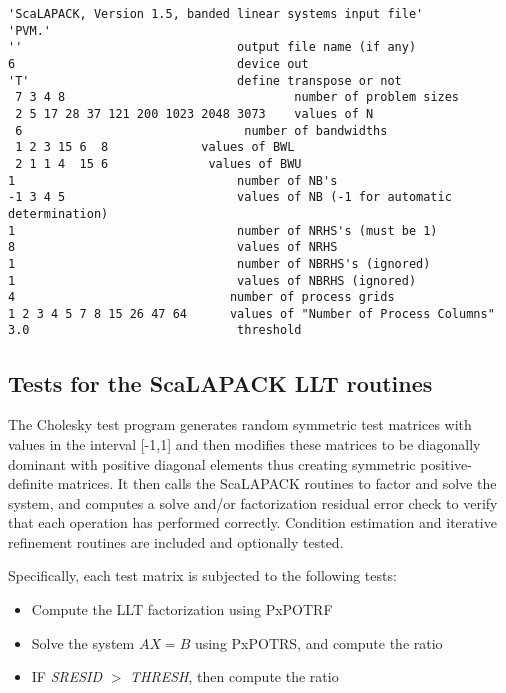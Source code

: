 \documentclass[11pt]{report}
\begin{document}
\begin{verbatim}
'ScaLAPACK, Version 1.5, banded linear systems input file'
'PVM.'
''                              output file name (if any)
6                               device out
'T'                             define transpose or not
 7 3 4 8                                number of problem sizes
 2 5 17 28 37 121 200 1023 2048 3073    values of N
 6                               number of bandwidths
 1 2 3 15 6  8             values of BWL
 2 1 1 4  15 6              values of BWU
1                               number of NB's
-1 3 4 5                        values of NB (-1 for automatic determination)
1                               number of NRHS's (must be 1)
8                               values of NRHS
1                               number of NBRHS's (ignored)
1                               values of NBRHS (ignored)
4                              number of process grids
1 2 3 4 5 7 8 15 26 47 64      values of "Number of Process Columns"
3.0                             threshold
\end{verbatim}

\subsection{Tests for the ScaLAPACK LLT routines}

The Cholesky test program generates random symmetric test matrices with
values in the interval [-1,1] and then modifies these matrices to be
diagonally dominant with positive diagonal elements thus creating
symmetric positive-definite matrices. It then calls the ScaLAPACK 
routines to factor and solve the system, and computes a solve and/or 
factorization residual error check to verify that each operation has performed 
correctly.  Condition estimation and iterative refinement routines are
included and optionally tested.

Specifically, each test matrix is subjected to the following tests:

\begin{itemize}
\item
Compute the LLT factorization using PxPOTRF
\item
Solve the system $A X = B$ using PxPOTRS, and compute the ratio
\item IF {\sl SRESID} $ >$ {\sl THRESH}, then compute the ratio
\end{itemize}
\end{document}
